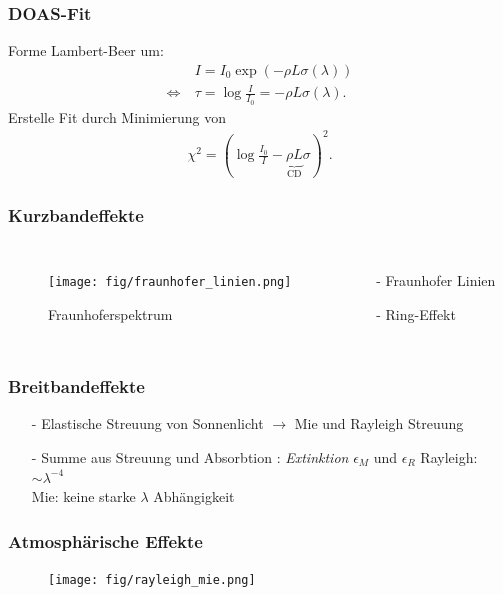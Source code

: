 \documentclass{beamer}
\begin{document}
\begin{frame}
    \frametitle{DOAS-Fit}
    Forme Lambert-Beer um:
	\begin{align}
        & I = I_0 \exp (-\rho L \sigma (\lambda)) \\
        \Leftrightarrow \ &\tau = \log \frac{I}{I_0} = - \rho L \sigma (\lambda).
	\end{align}
    \pause
	Erstelle Fit durch Minimierung von
    \begin{align}
        \chi^2 = ( \log \frac{I_0}{I} -\underbrace{\rho L}_{\text{CD}} \sigma )^2. 
    \end{align}
\end{frame}


\begin{frame}
    \frametitle{Kurzbandeffekte}
    \begin{columns}
    \begin{figure}
        \texttt{[image: fig/fraunhofer\_linien.png]}
        \caption{Fraunhoferspektrum}
    \end{figure}
        \begin{itemize}
            \item[-]{Fraunhofer Linien}
                \pause
            \item[-]{Ring-Effekt}
        \end{itemize}
    \end{columns}
\end{frame}

\begin{frame}
    \frametitle{Breitbandeffekte}
    \begin{itemize}
        \item[-] Elastische Streuung von Sonnenlicht $\to$ Mie und Rayleigh Streuung
            \pause
        \item[-] Summe aus Streuung und Absorbtion : \textit{Extinktion} $\epsilon_M$ und $\epsilon_R$
            \pause
    Rayleigh: $\sim \lambda^{-4}$\\
    Mie: keine starke $\lambda$ Abhängigkeit
    \end{itemize}
\end{frame}

\begin{frame}
    \frametitle{Atmosphärische Effekte}
    \begin{figure}
    	\texttt{[image: fig/rayleigh\_mie.png]}
    \end{figure}
\end{frame}
\end{document}
